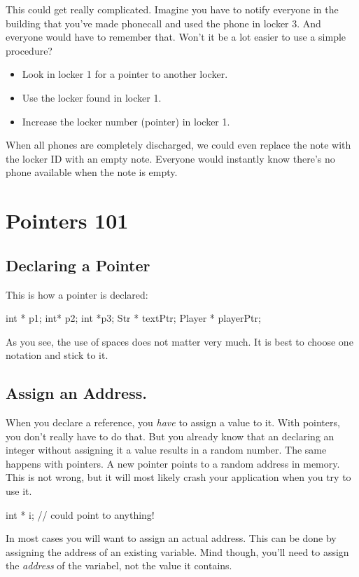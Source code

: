 This could get really complicated. Imagine you have to notify everyone in the building that you've made phonecall and used the phone in locker 3. And everyone would have to remember that. Won't it be a lot easier to use a simple procedure?

\begin{itemize}
  \item Look in locker 1 for a pointer to another locker.
  \item Use the locker found in locker 1.
  \item Increase the locker number (pointer) in locker 1.
\end{itemize}

When all phones are completely discharged, we could even replace the note with the locker ID with an empty note. Everyone would instantly know there's no phone available when the note is empty.

\section{Pointers 101}
\subsection{Declaring a Pointer}
This is how a pointer is declared:

\begin{code}
int * p1;
int* p2;
int *p3;
Str * textPtr;
Player * playerPtr;
\end{code}

As you see, the use of spaces does not matter very much. It is best to choose one notation and stick to it. 

\subsection{Assign an Address.}
When you declare a reference, you \textsl{have} to assign a value to it. With pointers, you don't really have to do that. But you already know that an declaring an integer without assigning it a value results in a random number. The same happens with pointers. A new pointer points to a random address in memory. This is not wrong, but it will most likely crash your application when you try to use it.

\begin{code}
int * i; // could point to anything!
\end{code}

In most cases you will want to assign an actual address. This can be done by assigning the address of an existing variable. Mind though, you'll need to assign the \textsl{address} of the variabel, not the value it contains.

